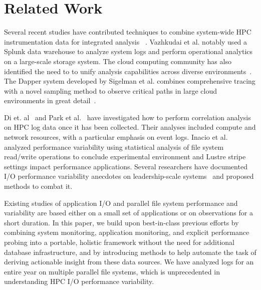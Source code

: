 \section{Related Work}

Several recent studies have contributed techniques to combine
system-wide HPC instrumentation data for integrated
analysis~\cite{Lockwood2017,Vazhkudai2017guide,Agelastos2014ldms,Kunkel2014siox,RIOT_2013}
. Vazhkudai et al. notably used a Splunk data warehouse to analyze system
logs and perform operational analytics on a large-scale storage system.
The cloud computing community has also identified the need to to unify
analysis capabilities across diverse environments~\cite{Vazhkudai2017guide}. The Dapper system
developed by Sigelman et al. combines comprehensive tracing with a novel
sampling method to observe critical paths in large cloud environments in great
detail~\cite{Sigelman2010dapper}.

Di et. al~\cite{7973730} and Park et al.~\cite{Park2017BigDM} have
investigated how to perform correlation analysis on HPC log data once it has been
collected.  Their analyses included compute and network resources, with a
particular emphasis on event logs. Inacio et al. analyzed performance variability using statistical analysis of file system read/write operations to conclude experimental environment and Lustre stripe settings impact performance applications. 
Several researchers have documented 
I/O performance variability anecdotes on leadership-scale
systems~\cite{Lofstead2010,Yildiz2016,carns2011understanding} and proposed
methods to combat it.  

Existing studies of application I/O and parallel file system performance and variability are based either on a small set of applications or on observations for a short duration. In this paper, we 
 build upon best-in-class previous efforts by combining system
monitoring, application monitoring, and explicit performance probing
into a portable, holistic framework without the need for additional database
infrastructure, and by introducing methods to help automate the task
of deriving actionable insight from these data sources. We have analyzed logs for an entire year on multiple parallel file systems, which is unprecedented in understanding HPC I/O performance variability.
